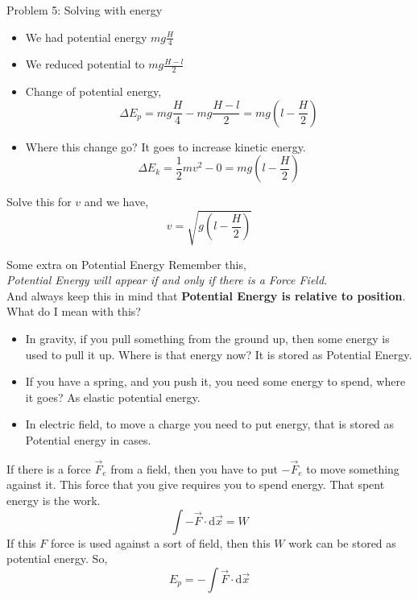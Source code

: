 \documentclass[9pt,serif]{beamer}
\begin{document}
\begin{frame}
    {Problem 5: Solving with energy}
    \begin{itemize}
        \item We had potential energy $mg \frac{H}{4}$ \pause
        \item We reduced potential to $mg \frac{H-l}{2}$ \pause
        \item Change of potential energy, 
            \[ \Delta E_p =mg \frac{H}{4 } - mg \frac{H-l}{2} = mg \left( l - \frac{H}{2} \right)  \] \pause
        \item Where this change go? It goes to increase kinetic energy. 
            \[ \Delta E_k= \frac{1}{2} mv^2 - 0 = mg \left( l - \frac{H}{2} \right)  \]
        
    \end{itemize}
    Solve this for $v$ and we have, 
    \[ \boxed{ v = \sqrt{g \left(  l - \frac{H}{2} \right) } } \]
    
\end{frame}
\begin{frame}
    {Some extra on Potential Energy}
    Remember this, \\
    \emph{Potential Energy will appear if and only if there is a Force Field.}\\
    And always keep this in mind that \textbf{Potential Energy is relative to position}. \\
    What do I mean with this? 
    \begin{itemize}
        \item In gravity, if you pull something from the ground up, then some energy is used to pull it up. Where is that energy now? It is stored as Potential Energy. \pause
        \item If you have a spring, and you push it, you need some energy to spend, where it goes? As elastic potential energy. \pause
        \item In electric field, to move a  charge you need to put energy, that is stored as Potential energy in cases. 
    \end{itemize}

    If there is a force $\vec F_e$ from a field, then you have to put $- \vec F_e$ to move something against it. This force that you give requires you to spend energy. That spent energy is the work.
    \[ \int -\vec F \cdot \mathrm d \vec x = W  \]
    If this $F$ force is used against a sort of field, then this $W$ work can be stored as potential energy. So, 
    \[ E_p = - \int \vec F \cdot \mathrm d \vec x  \]
    
\end{frame}
\end{document}
